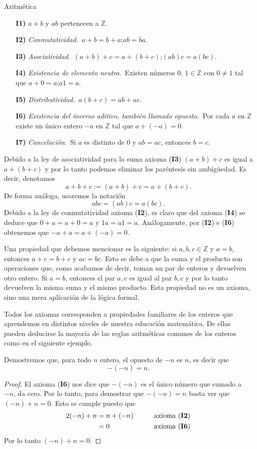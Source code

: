 \begin{section}{Aritmética}
\begin{enumerate}
\item[{\bf I1)}] $a+b$ y $ab$ pertenecen a ${\mathbb Z}$.
\item[{\bf I2)}] {\em Conmutatividad.}\, $a+b = b+a$;\qquad $ab=ba$. 
\item[{\bf I3)}] {\em Asociatividad.}\, $(a+b)+c = a+(b+c)$;\qquad $(ab)c = a(bc)$. 
\item[{\bf I4)}] {\em Existencia de elemento neutro.}\, Existen números $0$, $1 \in \mathbb Z$ con $0\not=1$ tal que $a+0=a$;\qquad $a1=a$. 
\item[{\bf I5)}] {\em Distributividad.}\, $a(b+c)=ab+ac$. 
\item[{\bf I6)}] {\em Existencia del inverso aditivo, también llamado opuesto.}\, Por cada $a$ en ${\mathbb Z}$ existe un único entero $-a$ en ${\mathbb Z}$ tal que $a+(-a)=0$. 
\item[{\bf I7)}] {\em Cancelación.}\, Si $a$ es distinto de $0$ y $ab=ac$, entonces $b=c$. 
\end{enumerate}


Debido a la ley de asociatividad para la suma axioma ({\bf I3}) $(a+b)+c$ es igual a $a+(b+c)$
y por lo tanto podemos eliminar los paréntesis sin ambigüedad. Es decir, denotamos
$$
a+b+c := (a+b)+c = a+(b+c).
$$
De forma análoga, usaremos la notación
$$
abc = (ab)c = a(bc).
$$
Debido a la ley de conmutatividad axioma ({\bf I2}), es claro que 
del axioma ({\bf I4}) se deduce que 
$0+a=a+0=a$ y $1a = a1=a$. Análogamente,  por  ({\bf I2}) e  ({\bf I6}) obtenemos que  $-a+a =   
a+(-a)=0$.

Una propiedad que debemos mencionar es la siguiente: si $a,b, c \in \mathbb Z$  y $a=b$, entonces $a+c = b+c$ y $ac = bc$. Esto se debe a que la suma y el producto son operaciones que, como acabamos de decir, toman un par de enteros y  devuelven otro entero. Si $a=b$, entonces el  par $a,c$ es igual al par $b,c$ y por lo tanto devuelven la misma suma y el mismo producto. Esta propiedad no es un axioma, sino  una mera aplicación de la lógica formal. 



Todos los axiomas corresponden a propiedades familiares de los 
enteros que aprendemos en distintos niveles de nuestra educación 
matemática. De ellas pueden deducirse la mayoría de las reglas 
aritméticas comunes de los enteros como en el siguiente ejemplo.

\begin{ejemplo}\label{Ej.opuesto_opuesto} Demostremos que, para todo $n$ entero, el opuesto de $-n$ es $n$, es decir que 
$$-(-n) = n.$$ 
\end{ejemplo}
\begin{proof} El axioma ({\bf I6}) nos dice que $-(-n)$ es el único número que sumado a $-n$, da cero. 
Por lo tanto, para demostrar que $-(-n) = n$ basta ver que $(-n)+n=0$.
Esto se cumple puesto que 
\begin{alignat*}2
(-n)+n&=n+(-n) &\qquad &\text{axioma ({\bf I2})} \\
&=0&\qquad &\text{axioma ({\bf I6})}
\end{alignat*}
Por lo tanto  $(-n)+n=0$.
\end{proof}



\end{section}
